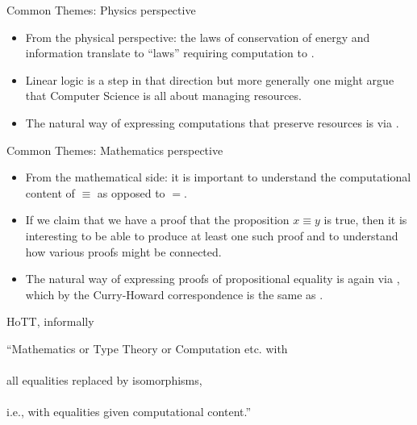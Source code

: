 \documentclass[11pt]{beamer}
\newcommand{\red}[1]{{\color{red}{#1}}}
\newcommand{\blue}[1]{{\color{blue}{#1}}}
\begin{document}
\begin{frame}{Common Themes: Physics perspective}

\begin{itemize}

\vfill\item From the physical perspective: the laws of conservation of energy
and information translate to ``laws'' requiring computation to \red{preserve
  resources}. 

\vfill\item Linear logic is a step in that direction but more generally one
might argue that Computer Science is all about managing resources.

\vfill\item The natural way of expressing computations that preserve
resources is via \red{type isomorphisms}.

\end{itemize}
\vfill
\end{frame}

\begin{frame}{Common Themes: Mathematics perspective}

\begin{itemize}

\vfill\item From the mathematical side: it is important to understand the
computational content of \blue{propositional equality} $\equiv$ as opposed to
\blue{definitional equality} $=$.

\vfill\item If we claim that we have a proof that the proposition $x \equiv
y$ is true, then it is interesting to be able to produce at least one such
proof and to understand how various proofs might be connected.

\vfill\item The natural way of expressing proofs of propositional equality is
again via \red{isomorphisms between propositions}, which by the Curry-Howard
correspondence is the same as \red{type isomorphisms}.

\end{itemize}
\vfill
\end{frame}

\begin{frame}{HoTT, informally}
\vfill

\begin{center}

``Mathematics or Type Theory or Computation etc. with \\ 
  \ \\
  all equalities replaced by isomorphisms, \\ 
  \ \\
  i.e., with equalities given computational content.''

\end{center}

\vfill
\end{frame}
\end{document}

